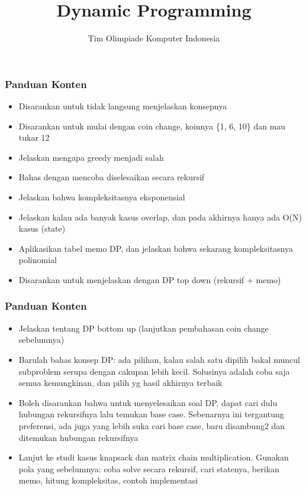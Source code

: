 

\title{Dynamic Programming}
\author{Tim Olimpiade Komputer Indonesia}
\date{}



\begin{frame}
\titlepage
\end{frame}

\begin{frame}
\frametitle{Panduan Konten}
\begin{itemize}
  \item Disarankan untuk tidak langsung menjelaskan konsepnya
  \item Disarankan untuk mulai dengan coin change, koinnya \{1, 6, 10\} dan mau tukar 12
  \item Jelaskan mengapa greedy menjadi salah
  \item Bahas dengan mencoba diselesaikan secara rekursif
  \item Jelaskan bahwa kompleksitasnya eksponensial
  \item Jelaskan kalau ada banyak kasus overlap, dan pada akhirnya hanya ada O(N) kasus (state)
  \item Aplikasikan tabel memo DP, dan jelaskan bahwa sekarang kompleksitasnya polinomial
  \item Disarankan untuk menjelaskan dengan DP top down (rekursif + memo)
\end{itemize}
\end{frame}

\begin{frame}
\frametitle{Panduan Konten}
\begin{itemize}
  \item Jelaskan tentang DP bottom up (lanjutkan pembahasan coin change sebelumnya)
  \item Barulah bahas konsep DP: ada pilihan, kalau salah satu dipilih bakal muncul subproblem serupa dengan cakupan lebih kecil. Solusinya adalah coba saja semua kemungkinan, dan pilih yg hasil akhirnya terbaik
  \item Boleh disarankan bahwa untuk menyelesaikan soal DP, dapat cari dulu hubungan rekursifnya lalu temukan base case. Sebenarnya ini tergantung preferensi, ada juga yang lebih suka cari base case, baru disambung2 dan ditemukan hubungan rekursifnya 
  \item Lanjut ke studi kasus knapsack dan matrix chain multiplication. Gunakan pola yang sebelumnya: coba solve secara rekursif, cari statenya, berikan memo, hitung kompleksitas, contoh implementasi
\end{itemize}
\end{frame}

